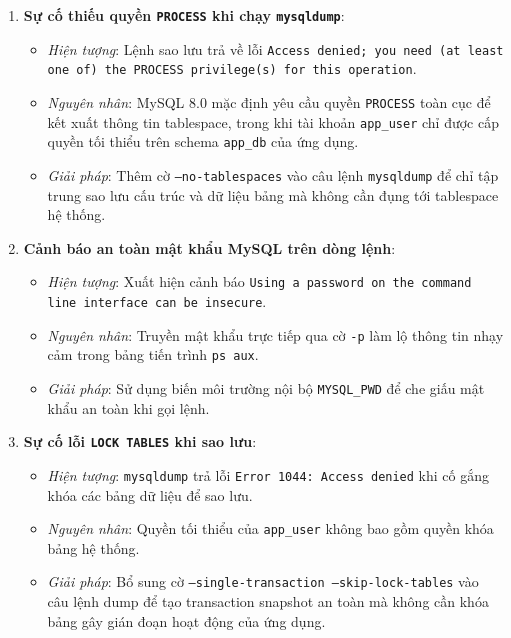 \documentclass[a4paper,12pt]{article}
\begin{document}
\begin{enumerate}
    \item \textbf{Sự cố thiếu quyền \texttt{PROCESS} khi chạy \texttt{mysqldump}}:
    \begin{itemize}
        \item \emph{Hiện tượng}: Lệnh sao lưu trả về lỗi \texttt{Access denied; you need (at least one of) the PROCESS privilege(s) for this operation}.
        \item \emph{Nguyên nhân}: MySQL 8.0 mặc định yêu cầu quyền \texttt{PROCESS} toàn cục để kết xuất thông tin tablespace, trong khi tài khoản \texttt{app\_user} chỉ được cấp quyền tối thiểu trên schema \texttt{app\_db} của ứng dụng.
        \item \emph{Giải pháp}: Thêm cờ \texttt{--no-tablespaces} vào câu lệnh \texttt{mysqldump} để chỉ tập trung sao lưu cấu trúc và dữ liệu bảng mà không cần đụng tới tablespace hệ thống.
    \end{itemize}

    \item \textbf{Cảnh báo an toàn mật khẩu MySQL trên dòng lệnh}:
    \begin{itemize}
        \item \emph{Hiện tượng}: Xuất hiện cảnh báo \texttt{Using a password on the command line interface can be insecure}.
        \item \emph{Nguyên nhân}: Truyền mật khẩu trực tiếp qua cờ \texttt{-p} làm lộ thông tin nhạy cảm trong bảng tiến trình \texttt{ps aux}.
        \item \emph{Giải pháp}: Sử dụng biến môi trường nội bộ \texttt{MYSQL\_PWD} để che giấu mật khẩu an toàn khi gọi lệnh.
    \end{itemize}

    \item \textbf{Sự cố lỗi \texttt{LOCK TABLES} khi sao lưu}:
    \begin{itemize}
        \item \emph{Hiện tượng}: \texttt{mysqldump} trả lỗi \texttt{Error 1044: Access denied} khi cố gắng khóa các bảng dữ liệu để sao lưu.
        \item \emph{Nguyên nhân}: Quyền tối thiểu của \texttt{app\_user} không bao gồm quyền khóa bảng hệ thống.
        \item \emph{Giải pháp}: Bổ sung cờ \texttt{--single-transaction --skip-lock-tables} vào câu lệnh dump để tạo transaction snapshot an toàn mà không cần khóa bảng gây gián đoạn hoạt động của ứng dụng.
    \end{itemize}


\end{enumerate}
\end{document}
